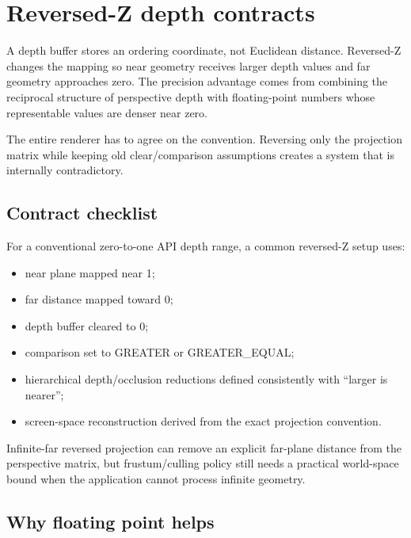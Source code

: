 \hypertarget{appendix-275ec8847057}{}
\section{Reversed-Z depth contracts}\label{appendix-275ec8847057-reversed-z-depth-contracts}

A depth buffer stores an ordering coordinate, not Euclidean distance. Reversed-Z changes the mapping so near geometry receives larger depth values and far geometry approaches zero. The precision advantage comes from combining the reciprocal structure of perspective depth with floating-point numbers whose representable values are denser near zero.

The entire renderer has to agree on the convention. Reversing only the projection matrix while keeping old clear/comparison assumptions creates a system that is internally contradictory.

\subsection{Contract checklist}\label{appendix-275ec8847057-contract-checklist}

For a conventional zero-to-one API depth range, a common reversed-Z setup uses:

\begin{itemize}
\tightlist
\item
  near plane mapped near 1;
\item
  far distance mapped toward 0;
\item
  depth buffer cleared to 0;
\item
  comparison set to GREATER or GREATER\_EQUAL;
\item
  hierarchical depth/occlusion reductions defined consistently with ``larger is nearer'';
\item
  screen-space reconstruction derived from the exact projection convention.
\end{itemize}

Infinite-far reversed projection can remove an explicit far-plane distance from the perspective matrix, but frustum/culling policy still needs a practical world-space bound when the application cannot process infinite geometry.

\subsection{Why floating point helps}\label{appendix-275ec8847057-why-floating-point-helps}

